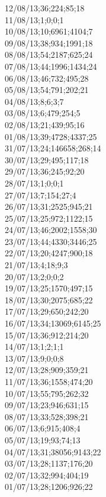 12/08/13;36;224;85;18 \\
11/08/13;1;0;0;1 \\
10/08/13;10;6961;4104;7 \\
09/08/13;38;934;1991;18 \\
08/08/13;54;2187;625;24 \\
07/08/13;44;1996;1434;24 \\
06/08/13;46;732;495;28 \\
05/08/13;54;791;202;21 \\
04/08/13;8;6;3;7 \\
03/08/13;6;479;254;5 \\
02/08/13;21;439;95;16 \\
01/08/13;39;4728;4337;25 \\
31/07/13;24;146658;268;14 \\
30/07/13;29;495;117;18 \\
29/07/13;36;245;92;20 \\
28/07/13;1;0;0;1 \\
27/07/13;7;154;27;4 \\
26/07/13;31;2525;945;21 \\
25/07/13;25;972;1122;15 \\
24/07/13;46;2002;1558;30 \\
23/07/13;44;4330;3446;25 \\
22/07/13;20;4247;900;18 \\
21/07/13;4;18;9;3 \\
20/07/13;2;0;0;2 \\
19/07/13;25;1570;497;15 \\
18/07/13;30;2075;685;22 \\
17/07/13;29;650;242;20 \\
16/07/13;34;13069;6145;25 \\
15/07/13;36;912;214;20 \\
14/07/13;1;2;1;1 \\
13/07/13;9;0;0;8 \\
12/07/13;28;909;359;21 \\
11/07/13;36;1558;474;20 \\
10/07/13;55;795;262;32 \\
09/07/13;23;946;631;15 \\
08/07/13;33;528;398;21 \\
06/07/13;6;915;408;4 \\
05/07/13;19;93;74;13 \\
04/07/13;31;38056;9143;22 \\
03/07/13;28;1137;176;20 \\
02/07/13;32;994;404;19 \\
01/07/13;28;1206;926;22 \\

